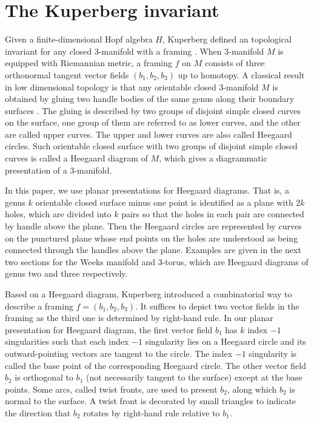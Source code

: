 \documentclass[12pt]{amsart}
\begin{document}
\section{The Kuperberg invariant}

Given a finite-dimensional Hopf algebra $H$, Kuperberg defined an topological invariant for any closed 3-manifold with a framing \cite{Kup96}. When 3-manifold $M$ is equipped with Riemannian metric, a framing $f$ on $M$ consists of three orthonormal tangent vector fields $(b_1, b_2, b_3)$ up to homotopy. A classical result in low dimensional topology is that any orientable closed 3-manifold $M$ is obtained by gluing two handle bodies of the same genus along their boundary surfaces \cite{Rol76}. The gluing is described by two groups of disjoint simple closed curves on the surface, one group of them are referred to as lower curves, and the other are called upper curves. The upper and lower curves are also called Heegaard circles. Such orientable closed surface with two groups of disjoint simple closed curves is called a Heegaard diagram of $M$, which gives a diagrammatic presentation of a 3-manifold. 

In this paper, we use planar presentations for Heegaard diagrams. That is, a genus $k$ orientable closed surface minus one point is identified as a plane with $2k$ holes, which are divided into $k$ pairs so that the holes in each pair are connected by handle above the plane. Then the Heegaard circles are represented by curves on the punctured plane whose end points on the holes are understood as being connected through the handles above the plane. Examples are given in the next two sections for the Weeks manifold and 3-torus, which are Heegaard diagrams of genus two and three respectively.

Based on a Heegaard diagram, Kuperberg introduced a combinatorial way to describe a framing $f=(b_1, b_2, b_3)$. It suffices to depict two vector fields in the framing as the third one is determined by right-hand rule. In our planar presentation for Heegaard diagram, the first vector field $b_1$ has $k$ index $-1$ singularities such that each index $-1$ singularity lies on a Heegaard circle and its outward-pointing vectors are tangent to the circle. The index $-1$ singularity is called the base point of the corresponding Heegaard circle. The other vector field $b_2$ is orthogonal to $b_1$ (not necessarily tangent to the surface) except at the base points. Some arcs, called twist fronts, are used to present $b_2$, along which $b_2$ is normal to the surface. A twist front is decorated by small triangles to indicate the direction that $b_2$ rotates by right-hand rule relative to $b_1$. 
\end{document}
